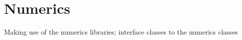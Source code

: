 \chapter{Numerics}

Making use of the numerics libraries; interface classes to the numerics classes
